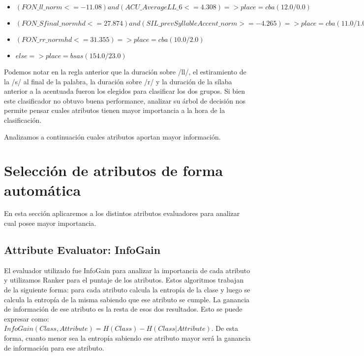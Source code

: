 \begin{flushleft}
\begin{itemize}

\item $(FON\_ll\_norm <= -11.08) and (ACU\_AverageLL\_6 <= 4.308) => place=cba (12.0/0.0)$ \\
\item $(FON\_Sfinal\_normhd <= 27.874) and (SIL\_prevSyllableAccent\_norm >= -4.265) => place=cba (11.0/1.0)$ \\
\item $(FON\_rr\_normhd <= 31.355) => place=cba (10.0/2.0)$ \\
\item $ else  => place=bsas (154.0/23.0)$
\end{itemize}
\end{flushleft}

Podemos notar en la regla anterior que la duración sobre /ll/, el estiramiento de la /s/ al final de la palabra, la duración sobre /r/ y la duración de la sílaba anterior a la acentuada fueron los elegidos para clasificar los dos grupos. Si bien este clasificador no obtuvo buena performance, analizar su árbol de decisión nos permite pensar cuales atributos tienen mayor importancia a la hora de la clasificación.

Analizamos a continuación cuales atributos aportan mayor información.

\section{Selección de atributos de forma automática}

En esta sección aplicaremos a los distintos atributos evaluadores para analizar cual posee mayor importancia. 

\subsection*{Attribute Evaluator: InfoGain}

El evaluador utilizado fue InfoGain para analizar la importancia de cada atributo y utilizamos Ranker para el puntaje de los atributos. Estos algoritmos trabajan de la siguiente forma: para cada atributo calcula la entropía de la clase y luego se calcula la entropía de la misma sabiendo que ese atributo se cumple. La ganancia de información de ese atributo es la resta de esos dos resultados. Esto se puede expresar como: $InfoGain(Class,Attribute) = H(Class) - H(Class | Attribute)$. De esta forma, cuanto menor sea la entropía sabiendo ese atributo mayor será la ganancia de información para ese atributo.

